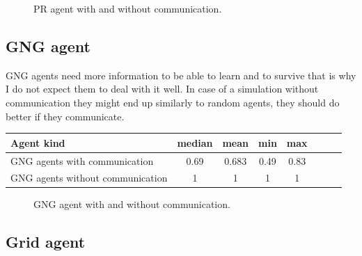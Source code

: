 
\begin{figure}[h!]
  \centering       
  \caption{PR agent with and without communication.}
\end{figure} 

\clearpage

\subsection{GNG agent}

GNG agents need more information to be able to learn and to survive that is why I do not expect them to deal with it well. In case of a simulation without communication they might end up similarly to random agents, they should do better if they communicate.

\begin{center}   
  \begin{tabular}{l*{6}{c}r}
  Agent kind        & median & mean & min & max \\
  \hline  
  GNG agents with communication        & 0.69 & 0.683 & 0.49 & 0.83 \\
  GNG agents without communication        & 1 & 1 & 1 & 1 \\
  \end{tabular}                  
\end{center}


\begin{figure}[h!]
  \centering      
  \caption{GNG agent with and without communication.}
\end{figure} 

\clearpage

\subsection{Grid agent}            

